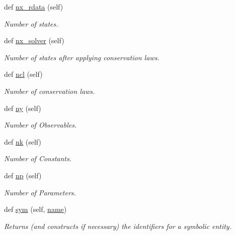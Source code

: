 \begin{DoxyCompactItemize}
def \mbox{\hyperlink{classamici_1_1ode__export_1_1_o_d_e_model_ab77e1355e82f8fe321044cc622e4446a}{nx\+\_\+rdata}} (self)
\begin{DoxyCompactList}\small\item\em Number of states. \end{DoxyCompactList}\item 
def \mbox{\hyperlink{classamici_1_1ode__export_1_1_o_d_e_model_ae4c34666f3d1d7f0c7a54a0b2322a1f3}{nx\+\_\+solver}} (self)
\begin{DoxyCompactList}\small\item\em Number of states after applying conservation laws. \end{DoxyCompactList}\item 
def \mbox{\hyperlink{classamici_1_1ode__export_1_1_o_d_e_model_a96964f4a635095d20c61f4976fd3070c}{ncl}} (self)
\begin{DoxyCompactList}\small\item\em Number of conservation laws. \end{DoxyCompactList}\item 
def \mbox{\hyperlink{classamici_1_1ode__export_1_1_o_d_e_model_ac3d9b681827ebea0e5bee18c9d7fc44d}{ny}} (self)
\begin{DoxyCompactList}\small\item\em Number of Observables. \end{DoxyCompactList}\item 
def \mbox{\hyperlink{classamici_1_1ode__export_1_1_o_d_e_model_a07767f24c77537a68972e99a79ef93aa}{nk}} (self)
\begin{DoxyCompactList}\small\item\em Number of Constants. \end{DoxyCompactList}\item 
def \mbox{\hyperlink{classamici_1_1ode__export_1_1_o_d_e_model_a7278a09e012ba867faf10d809e13fb81}{np}} (self)
\begin{DoxyCompactList}\small\item\em Number of Parameters. \end{DoxyCompactList}\item 
def \mbox{\hyperlink{classamici_1_1ode__export_1_1_o_d_e_model_a47906a8f4c249a513f4d6ca7c12d2304}{sym}} (self, \mbox{\hyperlink{classamici_1_1ode__export_1_1_o_d_e_model_a4d110acf8e52c4d48044071ea06952c0}{name}})
\begin{DoxyCompactList}\small\item\em Returns (and constructs if necessary) the identifiers for a symbolic entity. \end{DoxyCompactList}\item 

\end{DoxyCompactItemize}
